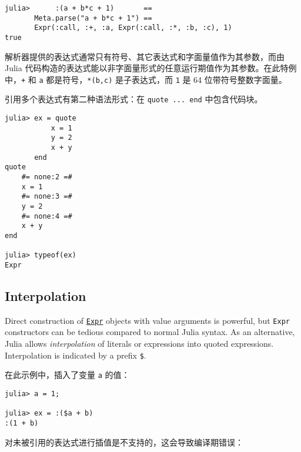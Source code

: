 \begin{verbatim}
julia>      :(a + b*c + 1)       ==
       Meta.parse("a + b*c + 1") ==
       Expr(:call, :+, :a, Expr(:call, :*, :b, :c), 1)
true
\end{verbatim}



解析器提供的表达式通常只有符号、其它表达式和字面量值作为其参数，而由 Julia 代码构造的表达式能以非字面量形式的任意运行期值作为其参数。在此特例中，\texttt{+} 和 \texttt{a} 都是符号，\texttt{*(b,c)} 是子表达式，而 \texttt{1} 是 64 位带符号整数字面量。



引用多个表达式有第二种语法形式：在 \texttt{quote ... end} 中包含代码块。




\begin{verbatim}
julia> ex = quote
           x = 1
           y = 2
           x + y
       end
quote
    #= none:2 =#
    x = 1
    #= none:3 =#
    y = 2
    #= none:4 =#
    x + y
end

julia> typeof(ex)
Expr
\end{verbatim}



\hypertarget{6473060285850683914}{}


\subsection{Interpolation}



Direct construction of \hyperlink{17120496304147995299}{\texttt{Expr}} objects with value arguments is powerful, but \texttt{Expr} constructors can be tedious compared to {\textquotedbl}normal{\textquotedbl} Julia syntax. As an alternative, Julia allows \emph{interpolation} of literals or expressions into quoted expressions. Interpolation is indicated by a prefix \texttt{\$}.



在此示例中，插入了变量 \texttt{a} 的值：




\begin{verbatim}
julia> a = 1;

julia> ex = :($a + b)
:(1 + b)
\end{verbatim}



对未被引用的表达式进行插值是不支持的，这会导致编译期错误：




